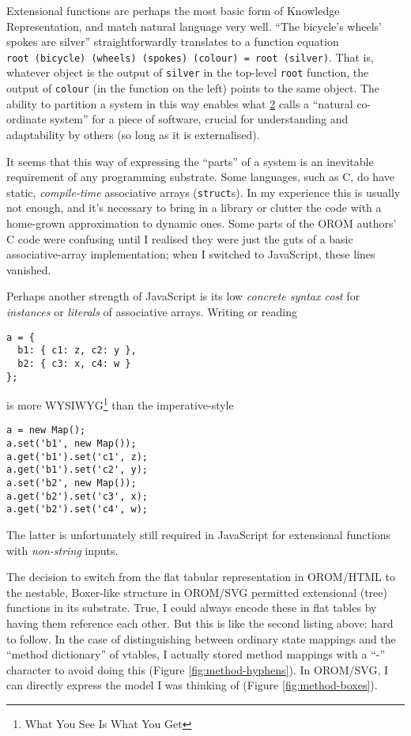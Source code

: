 Extensional functions are perhaps the most basic form of Knowledge
Representation, and match natural language very well. ``The bicycle's
wheels' spokes are silver'' straightforwardly translates to a function
equation
\texttt{root\ (bicycle)\ (wheels)\ (spokes)\ (colour)\ =\ root\ (silver)}.
That is, whatever object is the output of \texttt{silver} in the
top-level \texttt{root} function, the output of \texttt{colour} (in the
function on the left) points to the same object. The ability to
partition a system in this way enables what
\href{https://github.com/amb26/papers/blob/master/ppig-2016a/ppig2016a.pdf}{2}
calls a ``natural co-ordinate system'' for a piece of software, crucial
for understanding and adaptability by others (so long as it is
externalised).

It seems that this way of expressing the ``parts'' of a system is an
inevitable requirement of any programming substrate. Some languages,
such as C, do have static, \emph{compile-time} associative arrays
(\texttt{struct}s). In my experience this is usually not enough, and
it's necessary to bring in a library or clutter the code with a
home-grown approximation to dynamic ones. Some parts of the OROM
authors' C code were confusing until I realised they were just the guts
of a basic associative-array implementation; when I switched to
JavaScript, these lines vanished.

Perhaps another strength of JavaScript is its low \emph{concrete syntax
cost} for \emph{instances} or \emph{literals} of associative arrays.
Writing or reading

\begin{lstlisting}
a = {
  b1: { c1: z, c2: y },
  b2: { c3: x, c4: w }
};
\end{lstlisting}

is more WYSIWYG\footnote{What You See Is What You Get} than the
imperative-style

\begin{lstlisting}
a = new Map();
a.set('b1', new Map());
a.get('b1').set('c1', z);
a.get('b1').set('c2', y);
a.set('b2', new Map());
a.get('b2').set('c3', x);
a.get('b2').set('c4', w);
\end{lstlisting}

The latter is unfortunately still required in JavaScript for extensional
functions with \emph{non-string} inputs.

The decision to switch from the flat tabular representation in OROM/HTML
to the nestable, Boxer-like structure in OROM/SVG permitted extensional
(tree) functions in its substrate. True, I could always encode these in
flat tables by having them reference each other. But this is like the
second listing above: hard to follow. In the case of distinguishing
between ordinary state mappings and the ``method dictionary'' of
vtables, I actually stored method mappings with a ``-'' character to
avoid doing this (Figure \ref{fig:method-hyphens}). In OROM/SVG, I can
directly express the model I was thinking of (Figure
\ref{fig:method-boxes}).

